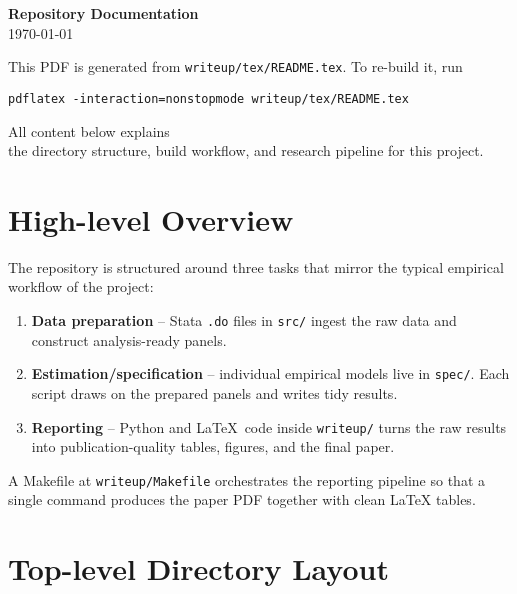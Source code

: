 \documentclass[11pt]{article}
\newcommand{\code}[1]{\texttt{#1}}
\begin{document}
\begin{center}
  {\LARGE \bf Repository Documentation}\\[0.5em]
  \today
\end{center}

\vspace{1em}

This PDF is generated from \code{writeup/tex/README.tex}.  To re-build it, run

\begin{verbatim}
pdflatex -interaction=nonstopmode writeup/tex/README.tex
\end{verbatim}

All content below explains \\the directory structure, build workflow, and
research pipeline for this project.

\tableofcontents

\newpage

\section{High-level Overview}

The repository is structured around three tasks that mirror the typical
empirical workflow of the project:

\begin{enumerate}[label=\arabic*)]
    \item \textbf{Data preparation} – Stata \code{.do} files in \code{src/}
          ingest the raw data and construct analysis-ready panels.
    \item \textbf{Estimation/specification} – individual empirical models
          live in \code{spec/}.  Each script draws on the prepared panels and
          writes tidy results.
    \item \textbf{Reporting} – Python and \LaTeX\ code inside \code{writeup/}
          turns the raw results into publication-quality tables, figures, and
          the final paper.
\end{enumerate}

A Makefile at \code{writeup/Makefile} orchestrates the reporting pipeline so
that a single command produces the paper PDF together with clean \LaTeX
tables.

\section{Top-level Directory Layout}
\end{document}
